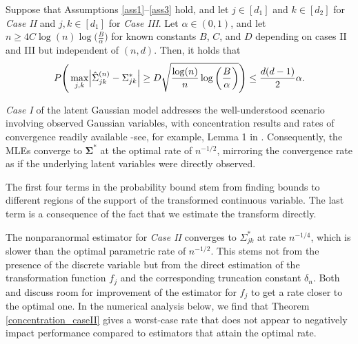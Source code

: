 \begin{change}
    \begin{theorem*}
        Suppose that Assumptions \ref{ass1}--\ref{ass3} hold, and let $j \in [d_1]$ and $k \in [d_2]$ for  \textit{Case II} and $j,k \in [d_1]$ for \textit{Case III}. Let $\alpha \in (0,1)$, and let \(n \geq 4 C \log(n) \log\Big(\frac{B}{\alpha}\Big)\) for known constants $B$, $C$, and $D$ depending on cases II and III but independent of $(n,d)$. Then, it holds that
        \begin{equation*}
            P\Bigg(\max_{j,k}\abs{\hat{\Sigma}_{jk}^{(n)} - \Sigma_{jk}^{*}} \geq D\sqrt{\frac{\log(n)}{n} \log\bigg(\frac{B}{\alpha}\bigg)}\Bigg) \leq \frac{d(d-1)}{2}\alpha.
        \end{equation*}
    \end{theorem*}
    \textit{Case I} of the latent Gaussian model addresses the well-understood scenario involving observed Gaussian variables, with concentration results and rates of convergence readily available -see, for example, Lemma 1 in \citet{Ravikumar11}. Consequently, the MLEs converge to \(\mathbf{\Sigma}^{*}\) at the optimal rate of \(n^{-1/2}\), mirroring the convergence rate as if the underlying latent variables were directly observed.
\end{change}

\begin{change}
    The first four terms in the probability bound stem from finding bounds to different regions of the support of the transformed continuous variable. The last term is a consequence of the fact that we estimate the transform directly.

    The nonparanormal estimator for \textit{Case II} converges to \(\Sigma_{jk}^*\) at rate \(n^{-1/4}\), which is slower than the optimal parametric rate of \(n^{-1/2}\). This stems not from the presence of the discrete variable but from the direct estimation of the transformation function \({f}_j\) and the corresponding truncation constant \(\delta_n\). Both \citet{Xue12} and \citet{Liu12} discuss room for improvement of the estimator for \(f_j\) to get a rate closer to the optimal one. In the numerical analysis below, we find that Theorem \ref{concentration_caseII} gives a worst-case rate that does not appear to negatively impact performance compared to estimators that attain the optimal rate.
\end{change}

